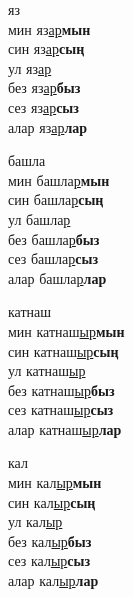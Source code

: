 \begin{multicols}{4}
\begin{enumerate}
\begin{minipage}{\linewidth}
    \item
    яз\\
    мин яз\underline{ар}\textbf{мын}\\
    син яз\underline{ар}\textbf{сың}\\
    ул яз\underline{ар}\\
    без яз\underline{ар}\textbf{быз}\\
    сез яз\underline{ар}\textbf{сыз}\\
    алар яз\underline{ар}\textbf{лар}\\
\end{minipage}

\begin{minipage}{\linewidth}
    \item
    башла\\
    мин башла\underline{р}\textbf{мын}\\
    син башла\underline{р}\textbf{сың}\\
    ул башла\underline{р}\\
    без башла\underline{р}\textbf{быз}\\
    сез башла\underline{р}\textbf{сыз}\\
    алар башла\underline{р}\textbf{лар}\\
\end{minipage}

\begin{minipage}{\linewidth}
    \item
    катнаш\\
    мин катнаш\underline{ыр}\textbf{мын}\\
    син катнаш\underline{ыр}\textbf{сың}\\
    ул катнаш\underline{ыр}\\
    без катнаш\underline{ыр}\textbf{быз}\\
    сез катнаш\underline{ыр}\textbf{сыз}\\
    алар катнаш\underline{ыр}\textbf{лар}\\
\end{minipage}

\begin{minipage}{\linewidth}
    \item
    кал\\
    мин кал\underline{ыр}\textbf{мын}\\
    син кал\underline{ыр}\textbf{сың}\\
    ул кал\underline{ыр}\\
    без кал\underline{ыр}\textbf{быз}\\
    сез кал\underline{ыр}\textbf{сыз}\\
    алар кал\underline{ыр}\textbf{лар}\\
\end{minipage}


\end{enumerate}
\end{multicols}
